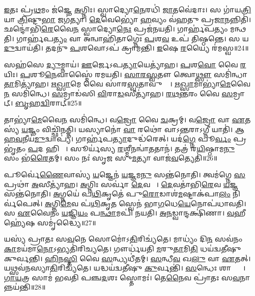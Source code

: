 \ul{𑌇}𑌤𑌃 𑌪𑍍𑌰॑\ul{𑌥}𑌮𑌂 𑌜॑𑌜𑍍𑌞𑍇 \ul{𑌅}𑌗𑍍𑌨𑌿𑌃।
𑌸𑍍𑌵𑌾𑌦𑍍𑌯𑍋\ul{𑌨𑍇}𑌰𑌧𑌿॑ \ul{𑌜𑌾}𑌤𑌵𑍇॑𑌦𑌾𑌃।
𑌸 𑌗𑌾॑𑌯\ul{𑌤𑍍𑌰𑌿}𑌯𑌾 \ul{𑌤𑍍𑌰𑌿}𑌷𑍍𑌟𑍁\ul{𑌭𑌾} 𑌜𑌗॑𑌤𑍍𑌯𑌾।
\ul{𑌦𑍇}𑌵𑍇𑌭𑍍𑌯𑍋॑ \ul{𑌹}𑌵𑍍𑌯𑌂 𑌵॑𑌹𑌤𑍁 𑌪𑍍𑌰\ul{𑌜𑌾}𑌨𑌨𑍍𑌨𑌿𑌤𑌿॑।
𑌛𑌨𑍍𑌦𑍋॑𑌭𑌿\ul{𑌰𑍇}𑌵𑍈\ul{𑌨}\ul{} 𑌸𑍍𑌵𑌾𑌦𑍍𑌯𑍋\ul{𑌨𑍇𑌃} 𑌪𑍍𑌰𑌜॑𑌨𑌯𑌤𑌿।
𑌗𑌾𑌰𑍍\mbox{}𑌹॑𑌪𑌤𑍍𑌯𑌂 𑌮𑌨𑍍𑌥𑌤𑌿।
𑌗𑌾𑌰𑍍\mbox{}𑌹॑𑌪\ul{𑌤𑍍𑌯𑌂} 𑌵𑌾 𑌅𑌨𑍍𑌵𑌾𑌹𑌿॑𑌤𑌾𑌗𑍍𑌨𑍇𑌃 \ul{𑌪}𑌶\ul{𑌵} 𑌉𑌪॑ 𑌤𑌿𑌷𑍍𑌠𑌨𑍍𑌤𑍇।
𑌸 𑌯\ul{𑌦𑍁}𑌦𑍍𑌵𑌾𑌯॑𑌤𑌿।
𑌤𑌦𑌨𑍁॑ \ul{𑌪}𑌶𑌵𑍋𑌽𑌪॑ 𑌕𑍍𑌰𑌾𑌮𑌨𑍍𑌤𑌿।
\ul{𑌇}𑌷𑍇 \ul{𑌰}𑌯𑍍𑌯𑍈 𑌰॑𑌮𑌸𑍍𑌵॥24॥

𑌸𑌹॑𑌸𑍇 \ul{𑌦𑍍𑌯𑍁}𑌮𑍍𑌨𑌾𑌯॑।
\ul{𑌊}𑌰𑍍𑌜𑍇\-𑌽𑌪\ul{𑌤𑍍𑌯𑌾}𑌯𑍇𑌤𑍍𑌯𑌾॑𑌹।
\ul{𑌪}𑌶\ul{𑌵𑍋} 𑌵𑍈 \ul{𑌰}𑌯𑌿𑌃।
\ul{𑌪}𑌶𑍂\ul{𑌨𑍇}𑌵𑌾𑌸𑍍𑌮𑍈॑ 𑌰𑌮𑌯𑌤𑌿।
\ul{𑌸𑌾}\ul{𑌰}\ul{𑌸𑍍𑌵}𑌤𑍗 𑌤𑍍𑌵𑍋\ul{𑌥𑍍𑌸𑍗} 𑌸𑌮𑌿॑𑌨𑍍𑌧𑌾\ul{𑌤𑌾}𑌮𑌿𑌤𑍍𑌯𑌾॑𑌹।
\ul{𑌋}\ul{𑌖𑍍𑌸𑌾}𑌮𑍇 𑌵𑍈 𑌸𑌾॑𑌰\ul{𑌸𑍍𑌵}𑌤𑌾𑌵𑍁𑌥𑍍𑌸𑍗᳚।
\ul{𑌋}\ul{𑌖𑍍𑌸𑌾}𑌮𑌾𑌭𑍍𑌯𑌾॑\ul{𑌮𑍇}𑌵𑍈\ul{𑌨}\ul{} 𑌸𑌮𑌿॑𑌨𑍍𑌧𑍇।
\ul{𑌸}𑌮𑍍𑌰𑌾𑌡॑𑌸𑌿 \ul{𑌵𑌿}𑌰𑌾\ul{𑌡}𑌸𑍀𑌤𑍍𑌯𑌾॑𑌹।
\ul{𑌰}\ul{𑌥}\ul{𑌨𑍍𑌤}𑌰𑌂 𑌵𑍈 \ul{𑌸}𑌮𑍍𑌰𑌾𑌟𑍍।
\ul{𑌬𑍃}𑌹\ul{𑌦𑍍𑌵𑌿}𑌰𑌾𑌟𑍍॥25॥

𑌤𑌾𑌭𑍍𑌯𑌾॑\ul{𑌮𑍇}𑌵𑍈\ul{𑌨}\ul{} 𑌸𑌮𑌿॑𑌨𑍍𑌧𑍇।
𑌵\ul{𑌜𑍍𑌰𑍋} 𑌵𑍈 \ul{𑌚}𑌕𑍍𑌰𑌮𑍍।
𑌵\ul{𑌜𑍍𑌰𑍋} 𑌵𑌾 \ul{𑌏}𑌤𑌸𑍍𑌯॑ \ul{𑌯}𑌜𑍍𑌞𑌂 𑌵𑌿𑌚𑍍𑌛𑌿॑𑌨𑌤𑍍𑌤𑌿।
𑌯𑌸𑍍𑌯𑌾𑌨𑍋॑ \ul{𑌵𑌾} 𑌰𑌥𑍋॑ 𑌵𑌾𑌽\ul{𑌨𑍍𑌤}𑌰𑌾\-𑌽𑌗𑍍𑌨𑍀 𑌯𑌾𑌤𑌿॑।
\ul{𑌆}\ul{𑌹}\ul{𑌵}𑌨𑍀𑌯॑\ul{𑌮𑍁}𑌦𑍍𑌵𑌾𑌪𑍍𑌯॑।
𑌗𑌾𑌰𑍍\mbox{}𑌹॑𑌪\ul{𑌤𑍍𑌯𑌾}𑌦𑍁𑌦𑍍𑌧॑𑌰𑍇𑌤𑍍।
𑌯𑌦॑\ul{𑌗𑍍𑌨𑍇} 𑌪𑍂\ul{𑌰𑍍𑌵𑌂} 𑌪𑍍𑌰𑌭𑍃॑𑌤𑌂 \ul{𑌪}𑌦 𑌹𑌿 𑌤𑍇᳚।
𑌸𑍂𑌰𑍍𑌯॑𑌸𑍍𑌯 \ul{𑌰}𑌶𑍍𑌮𑍀𑌨𑌨𑍍𑌵𑌾॑\ul{𑌤}𑌤𑌾𑌨॑।
𑌤𑌤𑍍𑌰॑ 𑌰\ul{𑌯𑌿}𑌷𑍍𑌠𑌾𑌮\ul{𑌨𑍁} 𑌸𑌂 𑌭॑\ul{𑌰𑍈}𑌤𑌮𑍍।
𑌸𑌂 𑌨𑌃॑ 𑌸𑍃𑌜 𑌸𑍁\ul{𑌮}𑌤𑍍𑌯𑌾 𑌵𑌾𑌜॑\ul{𑌵}𑌤𑍍𑌯𑍇𑌤𑌿॑॥26॥

𑌪𑍂𑌰𑍍𑌵𑍇॑\ul{𑌣𑍈}𑌵𑌾𑌸𑍍𑌯॑ \ul{𑌯}𑌜𑍍𑌞𑍇𑌨॑ \ul{𑌯}𑌜𑍍𑌞𑌮\ul{𑌨𑍁} 𑌸𑌨𑍍𑌤॑𑌨𑍋𑌤𑌿।
𑌤𑍍𑌵𑌮॑𑌗𑍍𑌨𑍇 \ul{𑌸}𑌪𑍍𑌰𑌥𑌾॑ \ul{𑌅}𑌸𑍀𑌤𑍍𑌯𑌾॑𑌹।
\ul{𑌅}𑌗𑍍𑌨𑌿𑌃 𑌸𑌰𑍍𑌵𑌾॑ \ul{𑌦𑍇}𑌵𑌤𑌾𑌃᳚।
\ul{𑌦𑍇}𑌵𑌤𑌾॑𑌭𑌿\ul{𑌰𑍇}𑌵 \ul{𑌯}𑌜𑍍𑌞 𑌸𑌨𑍍𑌤॑𑌨𑍋𑌤𑌿।
\ul{𑌅}𑌗𑍍𑌨𑌯𑍇॑ 𑌪\ul{𑌥𑌿}𑌕𑍃𑌤𑍇॑ 𑌪𑍁\ul{𑌰𑍋}𑌡𑌾𑌶॑\ul{𑌮}𑌷𑍍𑌟𑌾𑌕॑𑌪𑌾\ul{𑌲𑌂} 𑌨𑌿𑌰𑍍𑌵॑𑌪𑍇𑌤𑍍।
\ul{𑌅}𑌗𑍍𑌨𑌿\ul{𑌮𑍇}𑌵 𑌪॑\ul{𑌥𑌿}𑌕𑍃\ul{𑌤}\ul{} 𑌸𑍍𑌵𑍇𑌨॑ 𑌭𑌾\ul{𑌗}𑌧𑍇\ul{𑌯𑍇}𑌨𑍋𑌪॑𑌧𑌾𑌵𑌤𑌿।
𑌸 \ul{𑌏}𑌵𑍈𑌨𑌂॑ \ul{𑌯}𑌜𑍍𑌞𑌿\ul{𑌯𑌂} 𑌪\ul{𑌨𑍍𑌥𑌾}𑌮𑌪𑌿॑ 𑌨𑌯𑌤𑌿।
\ul{𑌅}\ul{𑌨}𑌡𑍍𑌵𑌾𑌨𑍍𑌦𑌕𑍍𑌷𑌿॑𑌣𑌾।
\ul{𑌵}𑌹𑍀 𑌹𑍍𑌯𑍇॑𑌷 𑌸𑌮𑍃॑𑌦𑍍𑌧𑍍𑌯𑍈॥27॥

𑌯𑌸𑍍𑌯॑ 𑌪𑍍𑌰𑌾𑌤𑌃 𑌸\ul{𑌵}𑌨𑍇 𑌸𑍋𑌮𑍋॑\-𑌽\ul{𑌤𑌿}𑌰𑌿𑌚𑍍𑌯॑𑌤𑍇।
𑌮𑌾𑌧𑍍𑌯𑌂॑ 𑌦𑌿\ul{𑌨}\ul{} 𑌸𑌵॑𑌨𑌂 \ul{𑌕𑌾}𑌮𑌯॑𑌮𑌾\ul{𑌨𑍋}\-𑌽𑌭𑍍𑌯𑌤𑌿॑𑌰𑌿𑌚𑍍𑌯𑌤𑍇।
𑌗𑍗𑌰𑍍𑌧॑𑌯𑌤𑌿 \ul{𑌮}𑌰𑍁\ul{𑌤𑌾}𑌮𑌿\ul{𑌤𑌿} 𑌧𑌯॑𑌦𑍍𑌵𑌤𑍀𑌷𑍁 𑌕𑍁𑌰𑍍𑌵𑌨𑍍𑌤𑌿।
\ul{𑌹𑌿}𑌨\ul{𑌸𑍍𑌤𑌿} 𑌵𑍈 \ul{𑌸}𑌨𑍍𑌧𑍍𑌯𑌧𑍀॑𑌤𑌮𑍍।
\ul{𑌸}𑌨𑍍𑌧𑍀\ul{𑌵} 𑌖\ul{𑌲𑍁} 𑌵𑌾 \ul{𑌏}𑌤𑌤𑍍।
𑌯𑌥𑍍𑌸𑌵॑𑌨𑌸𑍍𑌯𑌾\ul{𑌤𑌿}𑌰𑌿𑌚𑍍𑌯॑𑌤𑍇।
𑌯𑌦𑍍𑌧𑌯॑𑌦𑍍𑌵𑌤𑍀𑌷𑍁 \ul{𑌕𑍁}𑌰𑍍𑌵𑌨𑍍𑌤𑌿॑।
\ul{𑌸}𑌨𑍍𑌧𑍇𑌃 𑌶𑌾𑌨𑍍𑌤𑍍𑌯𑍈᳚।
\ul{𑌗𑌾}\ul{𑌯}𑌤𑍍𑌰 𑌸𑌾𑌮॑ 𑌭𑌵𑌤𑌿 𑌪𑌞𑍍𑌚\ul{𑌦}𑌶𑌃 𑌸𑍍𑌤𑍋𑌮𑌃॑।
𑌤𑍇\ul{𑌨𑍈}𑌵 𑌪𑍍𑌰𑌾॑𑌤𑌃 𑌸\ul{𑌵}𑌨𑌾𑌨𑍍𑌨𑌯॑𑌨𑍍𑌤𑌿॥28॥

